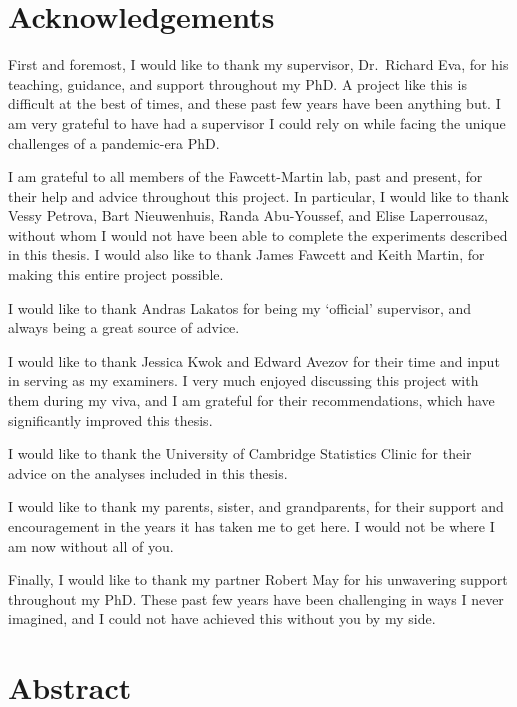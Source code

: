 \documentclass[
  12pt,
  a4paper,
]{book}
\begin{document}
\chapter*{Acknowledgements}\label{ACKNOWLEDGEMENTS}


First and foremost, I would like to thank my supervisor, Dr.~Richard Eva, for his teaching, guidance, and support throughout my PhD. A project like this is difficult at the best of times, and these past few years have been anything but. I am very grateful to have had a supervisor I could rely on while facing the unique challenges of a pandemic-era PhD.

I am grateful to all members of the Fawcett-Martin lab, past and present, for their help and advice throughout this project. In particular, I would like to thank Vessy Petrova, Bart Nieuwenhuis, Randa Abu-Youssef, and Elise Laperrousaz, without whom I would not have been able to complete the experiments described in this thesis. I would also like to thank James Fawcett and Keith Martin, for making this entire project possible.

I would like to thank Andras Lakatos for being my `official' supervisor, and always being a great source of advice.

I would like to thank Jessica Kwok and Edward Avezov for their time and input in serving as my examiners. I very much enjoyed discussing this project with them during my viva, and I am grateful for their recommendations, which have significantly improved this thesis.

I would like to thank the University of Cambridge Statistics Clinic for their advice on the analyses included in this thesis.

I would like to thank my parents, sister, and grandparents, for their support and encouragement in the years it has taken me to get here. I would not be where I am now without all of you.

Finally, I would like to thank my partner Robert May for his unwavering support throughout my PhD. These past few years have been challenging in ways I never imagined, and I could not have achieved this without you by my side.

\chapter*{Abstract}\label{ABSTRACT}
\end{document}
